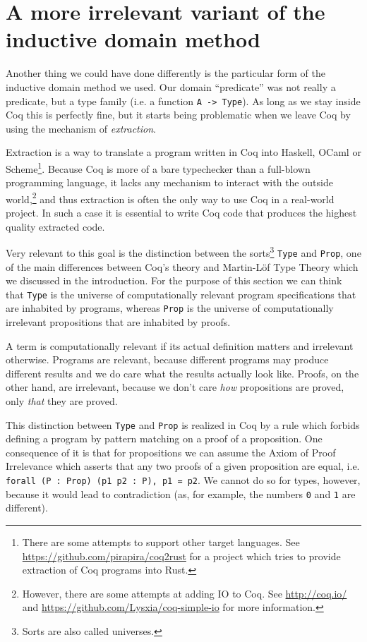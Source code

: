 \documentclass[declaration,mgr,english,shortabstract]{iithesis}
\newcommand{\m}[1]{\texttt{#1}}
\begin{document}
\section{A more irrelevant variant of the inductive domain method} \label{irrelevant}

Another thing we could have done differently is the particular form of the inductive domain method we used. Our domain ``predicate'' was not really a predicate, but a type family (i.e. a function \m{A -> Type}). As long as we stay inside Coq this is perfectly fine, but it starts being problematic when we leave Coq by using the mechanism of \textit{extraction}.

Extraction is a way to translate a program written in Coq into Haskell, OCaml or Scheme\footnote{There are some attempts to support other target languages. See \url{https://github.com/pirapira/coq2rust} for a project which tries to provide extraction of Coq programs into Rust.}. Because Coq is more of a bare typechecker than a full-blown programming language, it lacks any mechanism to interact with the outside world,\footnote{However, there are some attempts at adding IO to Coq. See \url{http://coq.io/} and \url{https://github.com/Lysxia/coq-simple-io} for more information.} and thus extraction is often the only way to use Coq in a real-world project. In such a case it is essential to write Coq code that produces the highest quality extracted code.

Very relevant to this goal is the distinction between the sorts\footnote{Sorts are also called universes.} \m{Type} and \m{Prop}, one of the main differences between Coq's theory and Martin-L\"{o}f Type Theory which we discussed in the introduction. For the purpose of this section we can think that \m{Type} is the universe of computationally relevant program specifications that are inhabited by programs, whereas \m{Prop} is the universe of computationally irrelevant propositions that are inhabited by proofs.

A term is computationally relevant if its actual definition matters and irrelevant otherwise. Programs are relevant, because different programs may produce different results and we do care what the results actually look like. Proofs, on the other hand, are irrelevant, because we don't care \textit{how} propositions are proved, only \textit{that} they are proved.

This distinction between \m{Type} and \m{Prop} is realized in Coq by a rule which forbids defining a program by pattern matching on a proof of a proposition. One consequence of it is that for propositions we can assume the Axiom of Proof Irrelevance which asserts that any two proofs of a given proposition are equal, i.e. \m{forall (P\ :\ Prop) (p1 p2\ :\ P), p1 = p2}. We cannot do so for types, however, because it would lead to contradiction (as, for example, the numbers \m{0} and \m{1} are different).
\end{document}
